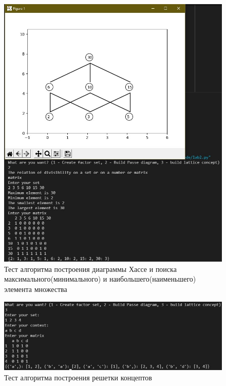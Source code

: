 \documentclass[spec, och, labwork]{shiza}
\begin{document}
        \begin{figure}[H]
            \centering      %
            \includegraphics[width=1.\textwidth]{2}
            \caption{Тест алгоритма построения диаграммы Хассе и поиска максимального(минимального) и наибольшего(наименьшего) элемента множества}
            \label{fig:image1}
        \end{figure}

        \begin{figure}[H]
            \centering      %
            \includegraphics[width=1.\textwidth]{3}
            \caption{Тест алгоритма построения решетки концептов}
            \label{fig:image1}
        \end{figure}
\end{document}
